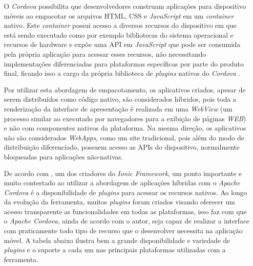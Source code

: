 O \textit{Cordova} possibilita que desenvolvedores construam aplicações para dispositivo móveis ao empacotar os arquivos HTML, CSS e \textit{JavaScript} em um \textit{container} nativo. Este \textit{container} possui acesso a diversos recursos do dispositivo em que está sendo executado como por exemplo bibliotecas do sistema operacional e recursos de hardware e expõe uma API em \textit{JavaScript} que pode ser consumida pela própria aplicação para acessar esses recursos, não necessitando implementações diferenciadas para plataformas específicas por parte do produto final, ficando isso a cargo da própria biblioteca de \textit{plugins} nativos do \textit{Cordova} \cite{Diwakar2012}.

Por utilizar esta abordagem de empacotamento, os aplicativos criados, apesar de serem distribuídos como código nativo, são considerados híbridos, pois toda a renderização da interface de apresentação é realizada em uma \textit{WebView} (um processo similar ao executado por navegadores para a exibição de páginas \textit{WEB}) e não com componentes nativos da plataforma. Na mesma direção, os aplicativos não são considerados \textit{WebApps}, como um site tradicional, pois além do modo de distribuição diferenciado, possuem acesso as APIs do dispositivo, normalmente bloqueadas para aplicações não-nativas. 


De acordo com \cite{CordovaLynch2014}, um dos criadores do \textit{Ionic Framework}, um ponto importante e muito contestado ao utilizar a abordagem de aplicações híbridas com o \textit{Apache Cordova} é a disponibilidade de \textit{plugins} para acessar os recursos nativos. Ao longo da evolução da ferramenta, muitos \textit{plugins} foram criados visando oferecer um acesso transparente as funcionalidades em todas as plataformas, isso faz com que o \textit{Apache Cordova}, ainda de acordo com o autor, seja capaz de realizar a interface com praticamente todo tipo de recurso que o desenvolver necessita na aplicação móvel. A tabela abaixo ilustra bem a grande disponibilidade e variedade de \textit{plugins} e o suporte a cada um nas principais plataformas utilizadas com a ferramenta. 

